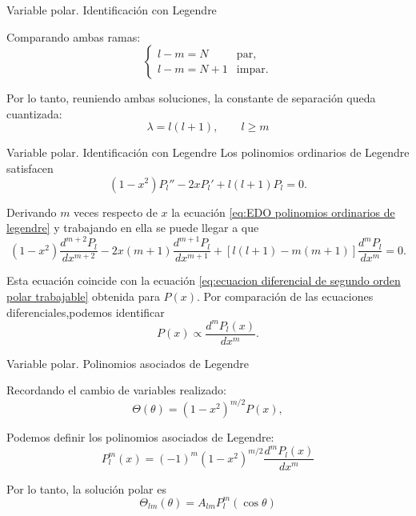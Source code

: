 \begin{frame}{Variable polar. Identificación con Legendre}

    Comparando ambas ramas:
    \[
        \begin{cases}
            l-m=N & \text{par},\\
            l-m=N+1 & \text{impar}.
        \end{cases}
    \]

    Por lo tanto, reuniendo ambas soluciones, la constante de separación queda cuantizada:
	\begin{equation}
        \lambda=l(l+1),\qquad l\geq m
	\end{equation}

    \end{frame}
    \begin{frame}{Variable polar. Identificación con Legendre}
    Los polinomios ordinarios de Legendre satisfacen
	\begin{equation}
        (1-x^2)P_l''-2xP_l'+l(l+1)P_l=0.
		\label{eq:EDO polinomios ordinarios de legendre}
	\end{equation}

	Derivando $m$ veces respecto de $x$ la ecuación \ref{eq:EDO polinomios ordinarios de legendre} y trabajando en ella se puede llegar a que
    \[
        (1-x^2)\frac{d^{m+2}P_l}{dx^{m+2}}-2x(m+1)\frac{d^{m+1}P_l}{dx^{m+1}}+[l(l+1)-m(m+1)]\frac{d^mP_l}{dx^m}=0.
    \]

	Esta ecuación coincide con la ecuación \ref{eq:ecuacion diferencial de segundo orden polar trabajable} obtenida para $P(x)$.    Por comparación de las ecuaciones diferenciales,podemos identificar
    \[
        P(x)\propto\frac{d^mP_l(x)}{dx^m}.
    \]
\end{frame}

\begin{frame}{Variable polar. Polinomios asociados de Legendre}


    Recordando el cambio de variables realizado:
    \[
        \Theta(\theta)=(1-x^2)^{m/2}P(x),
    \]

    Podemos definir los polinomios asociados de Legendre:
	\begin{equation}
        P_l^m(x)=(-1)^m(1-x^2)^{m/2}
        \frac{d^mP_l(x)}{dx^m}
		\label{eq:polinomio asociado de legendre}
	\end{equation}

    Por lo tanto, la solución polar es
	\begin{equation}
        \Theta_{lm}(\theta)=A_{lm}P_l^m(\cos\theta)
		\label{eq: solucion polar}
    \end{equation}

\end{frame}
